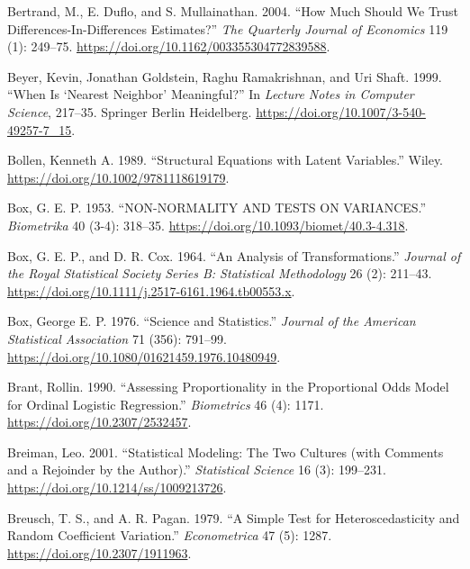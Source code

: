 \documentclass[
  letterpaper,
  10pt,
  twoside,
  openright,
  numbers=noenddot,
  chapterprefix=true]{scrbook}
\newlength{\cslhangindent}
\newenvironment{CSLReferences}[2] %
 {\begin{list}{}{%
  \setlength{\itemindent}{0pt}
  \setlength{\leftmargin}{0pt}
  \setlength{\parsep}{0pt}
  \ifodd #1
   \setlength{\leftmargin}{\cslhangindent}
   \setlength{\itemindent}{-1\cslhangindent}
  \fi
  \setlength{\itemsep}{#2\baselineskip}}}
 {\end{list}}
\begin{document}
\begin{CSLReferences}{1}{0}
Bertrand, M., E. Duflo, and S. Mullainathan. 2004. {``{How} {Much}
{Should} {We} {Trust} {Differences}-{In}-{Differences} {Estimates}?''}
\emph{{The} {Quarterly} {Journal} of {Economics}} 119 (1): 249--75.
\url{https://doi.org/10.1162/003355304772839588}.

Beyer, Kevin, Jonathan Goldstein, Raghu Ramakrishnan, and Uri Shaft.
1999. {``{When} {Is} {`{Nearest} {Neighbor}'} {Meaningful}?''} In
\emph{{Lecture} {Notes} in {Computer} {Science}}, 217--35. {Springer}
{Berlin} {Heidelberg}. \url{https://doi.org/10.1007/3-540-49257-7_15}.

Bollen, Kenneth A. 1989. {``{Structural} {Equations} with {Latent}
{Variables}.''} {Wiley}. \url{https://doi.org/10.1002/9781118619179}.

Box, G. E. P. 1953. {``{NON}-{NORMALITY} {AND} {TESTS} {ON}
{VARIANCES}.''} \emph{{Biometrika}} 40 (3-4): 318--35.
\url{https://doi.org/10.1093/biomet/40.3-4.318}.

Box, G. E. P., and D. R. Cox. 1964. {``{An} {Analysis} of
{Transformations}.''} \emph{{Journal} of the {Royal} {Statistical}
{Society} {Series} B: {Statistical} {Methodology}} 26 (2): 211--43.
\url{https://doi.org/10.1111/j.2517-6161.1964.tb00553.x}.

Box, George E. P. 1976. {``{Science} and {Statistics}.''}
\emph{{Journal} of the {American} {Statistical} {Association}} 71 (356):
791--99. \url{https://doi.org/10.1080/01621459.1976.10480949}.

Brant, Rollin. 1990. {``{Assessing} {Proportionality} in the
{Proportional} {Odds} {Model} for {Ordinal} {Logistic} {Regression}.''}
\emph{{Biometrics}} 46 (4): 1171. \url{https://doi.org/10.2307/2532457}.

Breiman, Leo. 2001. {``{Statistical} {Modeling}: {The} {Two} {Cultures}
(with Comments and a Rejoinder by the Author).''} \emph{{Statistical}
{Science}} 16 (3): 199--231.
\url{https://doi.org/10.1214/ss/1009213726}.

Breusch, T. S., and A. R. Pagan. 1979. {``A {Simple} {Test} for
{Heteroscedasticity} and {Random} {Coefficient} {Variation}.''}
\emph{{Econometrica}} 47 (5): 1287.
\url{https://doi.org/10.2307/1911963}.


\end{CSLReferences}
\end{document}
